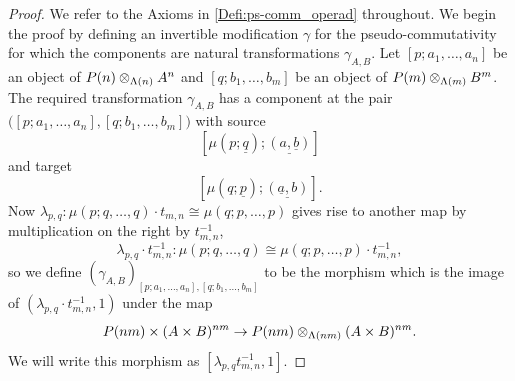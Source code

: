 \begin{proof}
We refer to the Axioms in \cref{Defi:ps-comm_operad} throughout. We begin the proof by defining an invertible modification $\gamma$ for the pseudo-commutativity for which the components are natural transformations $\gamma_{A,B}$. Let $[p;a_1,\ldots,a_n]$ be an object of $P(n) \otimes_{\Lambda(n)} A^{n}$ and $[q;b_1,\ldots,b_m]$ be an object of $P(m) \otimes_{\Lambda(m)} B^{m}$.
The required transformation $\gamma_{A,B}$ has a component at the pair $\big([p;a_1,\ldots,a_n], [q;b_1,\ldots,b_m] \big)$ with source
  \[
    \left[\mu\left(p; \underline{q}\right); \underline{(a, \underline{b})}\right]
  \]
and target
  \[
    \left[\mu\left(q; \underline{p}\right); \underline{(\underline{a},b)}\right].
  \]
Now $ \lambda_{p,q} \colon \mu(p;q,\ldots,q) \cdot t_{m,n} \cong \mu(q;p,\ldots,p)$ gives rise to another map by multiplication on the right by $t_{m,n}^{-1}$,
  \[
    \lambda_{p,q}\cdot t_{m,n}^{-1} \colon \mu(p;q,\ldots,q) \cong \mu(q;p,\ldots,p) \cdot t_{m,n}^{-1},
  \]
so we define $(\gamma_{A,B})_{[p;a_1,\ldots,a_n],[q;b_1,\ldots,b_m]}$ to be the morphism which is the image of $(\lambda_{p,q}\cdot t_{m,n}^{-1}, 1)$ under the map
  \[
   P(nm) \times (A \times B)^{nm} \rightarrow  P(nm) \otimes_{\Lambda(nm)} (A \times B)^{nm}.
  \]
  We will write this morphism as $[\lambda_{p,q}t_{m,n}^{-1}, 1]$.
  

\end{proof}
